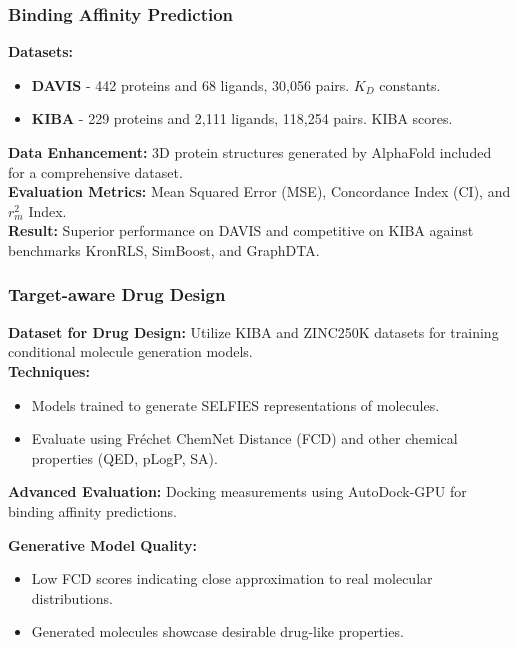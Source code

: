 \documentclass[11pt,xcolor={dvipsnames},hyperref={pdftex,pdfpagemode=UseNone,hidelinks,pdfdisplaydoctitle=true},usepdftitle=false]{beamer}
\begin{document}
\begin{frame}
\frametitle{Binding Affinity Prediction}
\textbf{Datasets:}
\begin{itemize}
    \item \textbf{DAVIS} - 442 proteins and 68 ligands, 30,056 pairs. $K_D$ constants.
    \item \textbf{KIBA} - 229 proteins and 2,111 ligands, 118,254 pairs. KIBA scores.
\end{itemize}
\textbf{Data Enhancement:} 3D protein structures generated by AlphaFold included for a comprehensive dataset. \\
\textbf{Evaluation Metrics:} Mean Squared Error (MSE), Concordance Index (CI), and $r_m ^ 2$ Index. \\
\textbf{Result:} Superior performance on DAVIS and competitive on KIBA against benchmarks KronRLS, SimBoost, and GraphDTA.

\end{frame}

\begin{frame}
\frametitle{Target-aware Drug Design}
\textbf{Dataset for Drug Design:} Utilize KIBA and ZINC250K datasets for training conditional molecule generation models. \\
\textbf{Techniques:}
\begin{itemize}
    \item Models trained to generate SELFIES representations of molecules.
    \item Evaluate using Fréchet ChemNet Distance (FCD) and other chemical properties (QED, pLogP, SA).
\end{itemize}
\textbf{Advanced Evaluation:} Docking measurements using AutoDock-GPU for binding affinity predictions.

\textbf{Generative Model Quality:}
\begin{itemize}
    \item Low FCD scores indicating close approximation to real molecular distributions.
    \item Generated molecules showcase desirable drug-like properties.
\end{itemize}
\end{frame}
\end{document}
